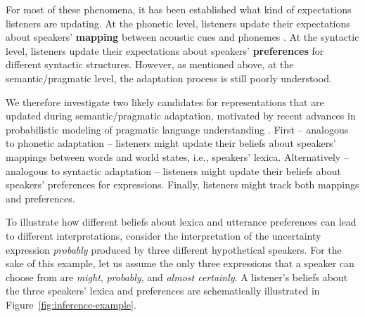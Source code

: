 \documentclass[lucida,biblatex]{sp} %
\begin{document}
For most of these phenomena, it has been established what kind of expectations listeners are updating. At the phonetic level, 
listeners update their expectations about speakers' \textbf{mapping} between acoustic cues and phonemes \citep[e.g.,][]{Kleinschmidt2015}.
At the syntactic level, listeners update their expectations about speakers' \textbf{preferences} 
for different syntactic structures. However, as mentioned above, at the semantic/pragmatic level, the adaptation process is still poorly understood. 

We therefore investigate two likely candidates for representations that are updated during semantic/pragmatic adaptation, motivated by recent advances in probabilistic modeling of pragmatic language understanding \cite{FrankGoodman2012,GoodmanFrank2016,FrankeJaeger2016}. First -- analogous to phonetic adaptation -- listeners might update their beliefs about speakers' mappings between 
words and world states, i.e., speakers' lexica. Alternatively -- analogous to syntactic adaptation -- 
listeners might update their beliefs about speakers' preferences
for expressions. Finally, listeners might track both mappings and preferences.

To illustrate how different beliefs about lexica and utterance preferences can lead to different interpretations, consider the interpretation 
of the uncertainty expression \textit{probably} produced by three different hypothetical speakers. For the sake of this example, 
let us assume the only three expressions that a speaker can choose from are \textit{might}, \textit{probably}, and \textit{almost certainly}.
A listener's beliefs about the three speakers' lexica and preferences are schematically illustrated in Figure~\ref{fig:inference-example}.
\end{document}

